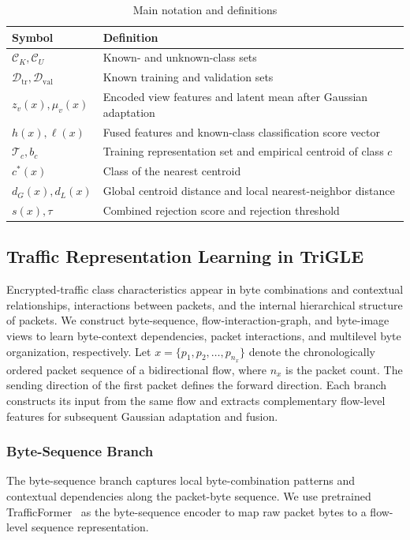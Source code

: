 \begin{table}[!t]\centering\begingroup
\renewcommand{\thetable}{3-1}
\caption{Main notation and definitions}\label{tab:notation}
\fontsize{8}{9.5}\selectfont\setlength{\tabcolsep}{3pt}
\begin{tabular}{@{}p{}p{}@{}}\hline
Symbol & Definition \\\hline
$\mathcal C_K,\mathcal C_U$ & Known- and unknown-class sets \\
$\mathcal D_{\mathrm{tr}},\mathcal D_{\mathrm{val}}$ & Known training and validation sets \\
$z_v(x),\mu_v(x)$ & Encoded view features and latent mean after Gaussian adaptation \\
$h(x),\ell(x)$ & Fused features and known-class classification score vector \\
$\mathcal T_c,b_c$ & Training representation set and empirical centroid of class $c$ \\
$c^*(x)$ & Class of the nearest centroid \\
$d_G(x),d_L(x)$ & Global centroid distance and local nearest-neighbor distance \\
$s(x),\tau$ & Combined rejection score and rejection threshold \\\hline
\end{tabular}\endgroup\end{table}

\subsection{Traffic Representation Learning in TriGLE}
Encrypted-traffic class characteristics appear in byte combinations and contextual relationships, interactions between packets, and the internal hierarchical structure of packets. We construct byte-sequence, flow-interaction-graph, and byte-image views to learn byte-context dependencies, packet interactions, and multilevel byte organization, respectively. Let $x=\{p_1,p_2,\ldots,p_{n_x}\}$ denote the chronologically ordered packet sequence of a bidirectional flow, where $n_x$ is the packet count. The sending direction of the first packet defines the forward direction. Each branch constructs its input from the same flow and extracts complementary flow-level features for subsequent Gaussian adaptation and fusion.

\subsubsection{Byte-Sequence Branch}
The byte-sequence branch captures local byte-combination patterns and contextual dependencies along the packet-byte sequence. We use pretrained TrafficFormer~ as the byte-sequence encoder to map raw packet bytes to a flow-level sequence representation.

